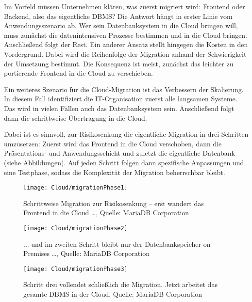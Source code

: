 Im Vorfeld müssen Unternehmen klären, was zuerst migriert wird: Frontend oder Backend, also das eigentliche DBMS? Die Antwort hängt in erster Linie vom Anwendungsszenario ab. Wer sein Datenbanksystem in die Cloud bringen will, muss zunächst die datenintensiven Prozesse bestimmen und in die Cloud bringen. Anschließend folgt der Rest. Ein anderer Ansatz stellt hingegen die Kosten in den Vordergrund. Dabei wird die Reihenfolge der Migration anhand der Schwierigkeit der Umsetzung bestimmt. Die Konsequenz ist meist, zunächst das leichter zu portierende Frontend in die Cloud zu verschieben.

Ein weiteres Szenario für die Cloud-Migration ist das Verbessern der Skalierung. In diesem Fall identifiziert die IT-Organisation zuerst alle langsamen Systeme. Das wird in vielen Fällen auch das Datenbanksystem sein. Anschließend folgt dann die schrittweise Übertragung in die Cloud.

Dabei ist es sinnvoll, zur Risikosenkung die eigentliche Migration in drei Schritten umzusetzen: Zuerst wird das Frontend in die Cloud verschoben, dann die Präsentations- und Anwendungsschicht und zuletzt die eigentliche Datenbank (siehe Abbildungen). Auf jeden Schritt folgen dann spezifische Anpassungen und eine Testphase, sodass die Komplexität der Migration beherrschbar bleibt.

\begin{figure}
	\texttt{[image: Cloud/migrationPhase1]}
	\caption[Schrittweise Migration zur Risikosenkung -- Frontend]{Schrittweise Migration zur Risikosenkung -- erst wandert das Frontend in die Cloud \ldots, Quelle: MariaDB Corporation}
\end{figure}

\begin{figure}
	\texttt{[image: Cloud/migrationPhase2]}
	\caption[Schrittweise Migration zur Risikosenkung -- Datenbankspeicher on Premises]{... und im zweiten Schritt bleibt nur der Datenbankspeicher on Premises \ldots, Quelle: MariaDB Corporation}
\end{figure}

\begin{figure}
	\texttt{[image: Cloud/migrationPhase3]}
	\caption[Schrittweise Migration zur Risikosenkung -- Vollständig]{Schritt drei vollendet schließlich die Migration. Jetzt arbeitet das gesamte DBMS in der Cloud, Quelle: MariaDB Corporation}
\end{figure}




